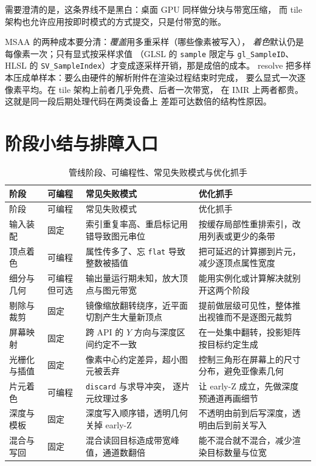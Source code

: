 \documentclass[12pt,a4paper,fontset=fandol]{ctexbook}
\newcommand{\Tp}[1]{\texttt{#1}}
\newcommand{\Lang}[1]{\textsf{#1}}
\newcommand{\DomGPU}{\Lang{GPU}}
\newcommand{\GSL}{\Lang{GLSL}}
\newcommand{\HSL}{\Lang{HLSL}}
\begin{document}
需要澄清的是，这条界线不是黑白：桌面 \DomGPU{} 同样做分块与带宽压缩，
而 tile 架构也允许应用按即时模式的方式提交，只是付带宽的账。

MSAA 的两种成本要分清：\emph{覆盖}用多重采样（哪些像素被写入），
\emph{着色}默认仍是每像素一次；只有显式按采样求值
（\GSL{} 的 \Tp{sample} 限定与 \Tp{gl\_SampleID}、\HSL{} 的
\Tp{SV\_SampleIndex}）才变成逐采样开销，那是成倍的成本。
resolve 把多样本压成单样本：要么由硬件的解析附件在渲染过程结束时完成，
要么显式一次逐像素平均。在 tile 架构上前者几乎免费、后者一次带宽，
在 IMR 上两者都贵。这就是同一段后期处理代码在两类设备上
差距可达数倍的结构性原因。

\section{阶段小结与排障入口}

\begin{longtable}{>{\raggedright\arraybackslash}p{}
                  >{\raggedright\arraybackslash}p{}
                  >{\raggedright\arraybackslash}p{}
                  >{\raggedright\arraybackslash}p{}}
\caption{管线阶段、可编程性、常见失败模式与优化抓手}
\label{tab:ch02-stages} \\
\toprule
阶段 & 可编程 & 常见失败模式 & 优化抓手 \\
\midrule
\endfirsthead
\toprule
阶段 & 可编程 & 常见失败模式 & 优化抓手 \\
\midrule
\endhead
\midrule
\endfoot
\bottomrule
\endlastfoot
输入装配 & 固定 & 索引重复率高、重启标记用错导致图元串位 &
按缓存局部性重排索引，改用列表或更少的条带 \\
顶点着色 & 可编程 & 属性传多了、忘 \Tp{flat} 导致整数被插值 &
把可延迟的计算挪到片元，减少逐顶点属性宽度 \\
细分与几何 & 可编程但可选 & 输出量运行期未知，放大顶点与图元带宽 &
能用实例化或计算解决就别开这两个阶段 \\
剔除与裁剪 & 固定 & 镜像缩放翻转绕序，近平面切割产生大量新顶点 &
提前做层级可见性，整体推出视锥而不是逐图元裁剪 \\
屏幕映射 & 固定 & 跨 API 的 $Y$ 方向与深度区间约定不一致 &
在一处集中翻转，投影矩阵按目标约定生成 \\
光栅化与插值 & 固定 & 像素中心约定差异，超小图元被丢弃 &
控制三角形在屏幕上的尺寸分布，避免亚像素几何 \\
片元着色 & 可编程 & \Tp{discard} 与求导冲突，
逐片元纹理过多 & 让 early-Z 成立，先做深度预通道再画细节 \\
深度与模板 & 固定 & 深度写入顺序错，透明几何关掉 early-Z &
不透明由前到后写深度，透明由后到前关写入 \\
混合与写回 & 固定 & 混合读回目标造成带宽峰值，通道数翻倍 &
能不混合就不混合，减少渲染目标数量与位宽 \\
\end{longtable}
\end{document}
